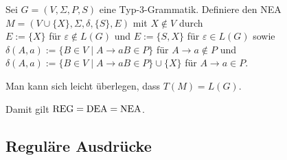 \begin{Beweis}
    Sei $G = (V, \Sigma, P, S)$ eine Typ-3-Grammatik.
    Definiere den NEA\\
    $M = (V \cup \{X\}, \Sigma, \delta, \{S\}, E)$ mit $X \notin V$ durch\\
    $E := \{X\}$ für $\varepsilon \notin L(G)$ und
    $E := \{S, X\}$ für $\varepsilon \in L(G)$ sowie\\
    $\delta(A, a) := \{B \in V \;|\; A \rightarrow aB \in P\}$ für
    $A \rightarrow a \notin P$ und\\
    $\delta(A, a) := \{B \in V \;|\; A \rightarrow aB \in P\} \cup \{X\}$ für
    $A \rightarrow a \in P$.

    Man kann sich leicht überlegen, dass $T(M) = L(G)$.
\end{Beweis}

\begin{Bem}
    Damit gilt $\text{REG} = \text{DEA} = \text{NEA}$.
\end{Bem}

\pagebreak

\subsection{%
    Reguläre Ausdrücke%
}

